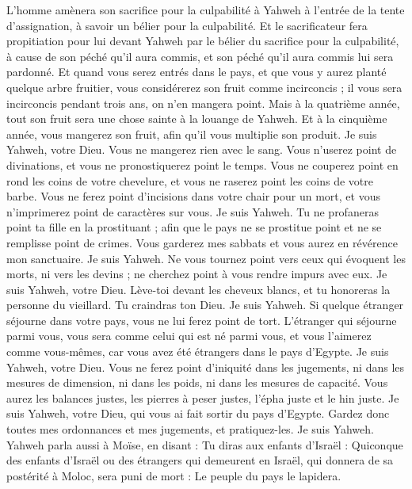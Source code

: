 \begin{multicols}{2}
L'homme amènera son sacrifice pour la culpabilité à Yahweh à l'entrée de la tente d'assignation, à savoir un bélier pour la culpabilité.
Et le sacrificateur fera propitiation pour lui devant Yahweh par le bélier du sacrifice pour la culpabilité, à cause de son péché qu'il aura commis, et son péché qu'il aura commis lui sera pardonné.
Et quand vous serez entrés dans le pays, et que vous y aurez planté quelque arbre fruitier, vous considérerez son fruit comme incirconcis ; il vous sera incirconcis pendant trois ans, on n'en mangera point.
Mais à la quatrième année, tout son fruit sera une chose sainte à la louange de Yahweh.
Et à la cinquième année, vous mangerez son fruit, afin qu'il vous multiplie son produit. Je suis Yahweh, votre Dieu.
Vous ne mangerez rien avec le sang. Vous n'userez point de divinations, et vous ne pronostiquerez point le temps.
Vous ne couperez point en rond les coins de votre chevelure, et vous ne raserez point les coins de votre barbe.
Vous ne ferez point d'incisions dans votre chair pour un mort, et vous n'imprimerez point de caractères sur vous. Je suis Yahweh.
Tu ne profaneras point ta fille en la prostituant ; afin que le pays ne se prostitue point et ne se remplisse point de crimes.
Vous garderez mes sabbats et vous aurez en révérence mon sanctuaire. Je suis Yahweh.
Ne vous tournez point vers ceux qui évoquent les morts, ni vers les devins ; ne cherchez point à vous rendre impurs avec eux. Je suis Yahweh, votre Dieu.
Lève-toi devant les cheveux blancs, et tu honoreras la personne du vieillard. Tu craindras ton Dieu. Je suis Yahweh.
Si quelque étranger séjourne dans votre pays, vous ne lui ferez point de tort.
L'étranger qui séjourne parmi vous, vous sera comme celui qui est né parmi vous, et vous l'aimerez comme vous-mêmes, car vous avez été étrangers dans le pays d'Egypte. Je suis Yahweh, votre Dieu.
Vous ne ferez point d'iniquité dans les jugements, ni dans les mesures de dimension, ni dans les poids, ni dans les mesures de capacité.
Vous aurez les balances justes, les pierres à peser justes, l'épha juste et le hin juste. Je suis Yahweh, votre Dieu, qui vous ai fait sortir du pays d'Egypte.
Gardez donc toutes mes ordonnances et mes jugements, et pratiquez-les. Je suis Yahweh.
\VerseOne{}Yahweh parla aussi à Moïse, en disant :
Tu diras aux enfants d'Israël : Quiconque des enfants d'Israël ou des étrangers qui demeurent en Israël, qui donnera de sa postérité à Moloc, sera puni de mort : Le peuple du pays le lapidera.

\end{multicols}
